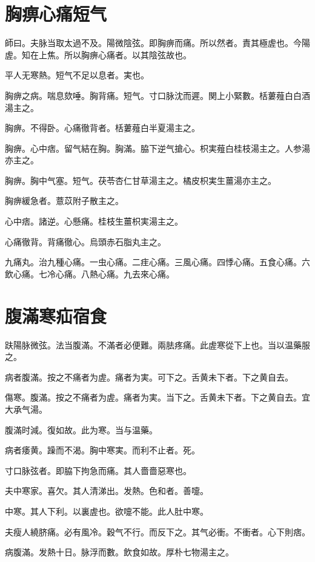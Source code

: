 \chapter{胸痹心痛短气}

師曰。夫脉当取太過不及。陽微陰弦。即胸痹而痛。所以然者。責其極虗也。今陽虗。知在上焦。所以胸痹心痛者。以其陰弦故也。

平人无寒熱。短气不足以息者。実也。

胸痹之病。喘息欬唾。胸背痛。短气。寸口脉沈而遲。関上小緊數。栝蔞薤白白酒湯主之。

胸痹。不得卧。心痛徹背者。栝蔞薤白半夏湯主之。

胸痹。心中痞。留气結在胸。胸滿。脇下逆{\khaaitp 气}搶心。枳実薤白桂枝湯主之。人参湯亦主之。

胸痹。胸中气塞。短气。茯苓杏仁甘草湯主之。橘{\khaaitp 皮}枳{\khaaitp 実生}薑湯亦主之。

胸痹緩急者。薏苡附子散主之。

心中痞。諸逆。心懸痛。桂枝生薑枳実湯主之。

心痛徹背。背痛徹心。烏頭赤石脂丸主之。

九痛丸。治九種心痛。一虫心痛。二疰心痛。三風心痛。四悸心痛。五食心痛。六飲心痛。七冷心痛。八熱心痛。九去來心痛。%

\chapter{腹滿寒疝宿食}

趺陽脉微弦。法当腹滿。不滿者必便難。兩胠疼痛。此虗寒從下上也。当以温藥服之。

病者腹滿。按之不痛{\khaaitp 者}为虗。痛者为実。可下之。舌黄未下者。下之黄自去。

傷寒。腹滿。按之不痛者为虗。痛者为実。当下之。舌黄未下者。下之黄自去。宜大承气湯。{\yuhan}

腹滿时減。復如故。此为寒。当与温藥。

病者痿黄。躁而不渴。胸中寒実。而利不止者。死。

寸口脉弦者。即脇下拘急而痛。其人嗇嗇惡寒也。

夫中寒家。喜欠。其人清涕出。发熱。色和者。善嚏。

中寒。其人下利。以裏虗也。欲嚏不能。此人肚中寒。

夫瘦人繞脐痛。必有風冷。穀气不行。而反下之。其气必衝。不衝者。心下則痞。

病腹滿。发熱十日。脉浮而數。飲食如故。厚朴七物湯主之。


